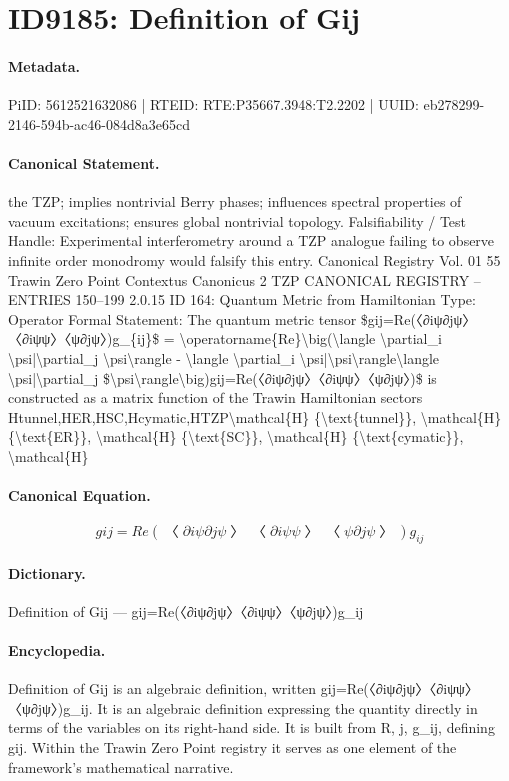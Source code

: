 \section*{ID9185: Definition of Gij}
\paragraph{Metadata.}
PiID: 5612521632086 | RTEID: RTE:P35667.3948:T2.2202 | UUID: eb278299-2146-594b-ac46-084d8a3e65cd

\paragraph{Canonical Statement.}
the TZP; implies nontrivial Berry phases; influences spectral properties of vacuum excitations; ensures global nontrivial topology. Falsifiability / Test Handle: Experimental interferometry around a TZP analogue failing to observe infinite order monodromy would falsify this entry. Canonical Registry Vol. 01 55 Trawin Zero Point Contextus Canonicus 2 TZP CANONICAL REGISTRY – ENTRIES 150–199 2.0.15 ID 164: Quantum Metric from Hamiltonian Type: Operator Formal Statement: The quantum metric tensor \$gij=Re(〈∂iψ∂jψ〉〈∂iψψ〉〈ψ∂jψ〉)g\_\{ij\}\$ = \textbackslash{}operatorname\{Re\}\textbackslash{}big(\textbackslash{}langle \textbackslash{}partial\_i \textbackslash{}psi|\textbackslash{}partial\_j \textbackslash{}psi\textbackslash{}rangle - \textbackslash{}langle \textbackslash{}partial\_i \textbackslash{}psi|\textbackslash{}psi\textbackslash{}rangle\textbackslash{}langle \textbackslash{}psi|\textbackslash{}partial\_j \$\textbackslash{}psi\textbackslash{}rangle\textbackslash{}big)gij=Re(〈∂iψ∂jψ〉〈∂iψψ〉〈ψ∂jψ〉)\$ is constructed as a matrix function of the Trawin Hamiltonian sectors Htunnel,HER,HSC,Hcymatic,HTZP\textbackslash{}mathcal\{H\} \{\textbackslash{}text\{tunnel\}\}, \textbackslash{}mathcal\{H\} \{\textbackslash{}text\{ER\}\}, \textbackslash{}mathcal\{H\} \{\textbackslash{}text\{SC\}\}, \textbackslash{}mathcal\{H\} \{\textbackslash{}text\{cymatic\}\}, \textbackslash{}mathcal\{H\}

\paragraph{Canonical Equation.}
\[
gij=Re(〈∂iψ∂jψ〉〈∂iψψ〉〈ψ∂jψ〉)g_{ij}
\]

\paragraph{Dictionary.}
Definition of Gij — gij=Re(〈∂iψ∂jψ〉〈∂iψψ〉〈ψ∂jψ〉)g\_ij

\paragraph{Encyclopedia.}
Definition of Gij is an algebraic definition, written gij=Re(〈∂iψ∂jψ〉〈∂iψψ〉〈ψ∂jψ〉)g\_ij. It is an algebraic definition expressing the quantity directly in terms of the variables on its right-hand side. It is built from R, j, g\_ij, defining gij. Within the Trawin Zero Point registry it serves as one element of the framework's mathematical narrative.
